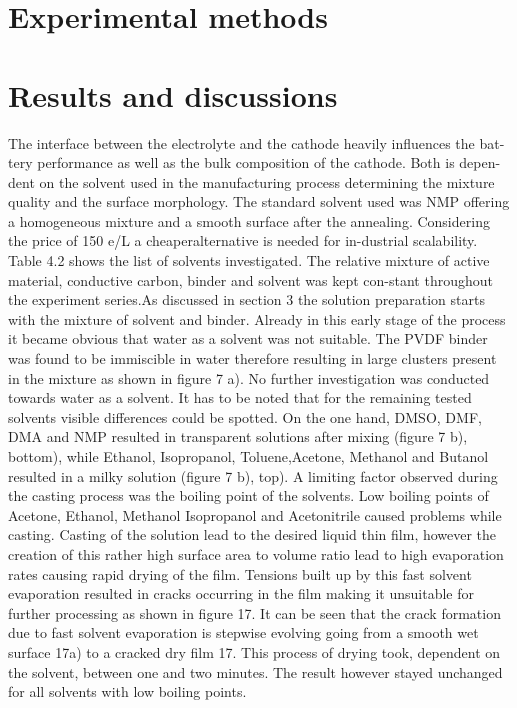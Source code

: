 \section{Experimental methods}
\section{Results and discussions}
The interface between the electrolyte and the cathode heavily influences the bat-tery performance as well as the bulk composition of the cathode. Both is depen-dent on the solvent used in the manufacturing process determining the mixture quality and the surface morphology. The standard solvent used was NMP oﬀering a homogeneous mixture and a smooth surface after the annealing. Considering the price of 150 e/L a cheaperalternative is needed for in-dustrial scalability. Table 4.2 shows the list of solvents investigated. The relative mixture of active material, conductive carbon, binder and solvent was kept con-stant throughout the experiment series.As discussed in section 3 the solution preparation starts with the mixture of solvent and binder. Already in this early stage of the process it became obvious that water as a solvent was not suitable. The PVDF binder was found to be immiscible in water therefore resulting in large clusters present in the mixture as shown in figure 7 a). No further investigation was conducted towards water as a solvent.
It has to be noted that for the remaining tested solvents visible diﬀerences could be spotted. On the one hand, DMSO, DMF, DMA and NMP resulted in transparent solutions after mixing (figure 7 b), bottom), while Ethanol, Isopropanol, Toluene,Acetone, Methanol and Butanol resulted in a milky solution (figure 7 b), top).
A limiting factor observed during the casting process was the boiling point of the solvents. Low boiling points of Acetone, Ethanol, Methanol Isopropanol and Acetonitrile caused problems while casting. Casting of the solution lead to the desired liquid thin film, however the creation of this rather high surface area to volume ratio lead to high evaporation rates causing rapid drying of the film. Tensions built up by this fast solvent evaporation resulted in cracks occurring in the film making it unsuitable for further processing as shown in figure 17.
It can be seen that the crack formation due to fast solvent evaporation is stepwise evolving going from a smooth wet surface 17a) to a cracked dry film 17. This process of drying took, dependent on the solvent, between one and two minutes. The result however stayed unchanged for all solvents with low boiling points.
